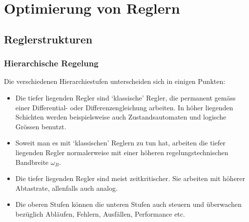 \section{Optimierung von Reglern }
\subsection{Reglerstrukturen }
\subsubsection{Hierarchische Regelung }
Die verschiedenen Hierarchiestufen unterscheiden sich in einigen Punkten:
\begin{itemize}
	\item Die tiefer liegenden Regler sind ‘klassische’ Regler, die permanent gemäss einer
	Differential- oder Differenzengleichung arbeiten. In höher liegenden Schichten
	werden beispielsweise auch Zustandsautomaten und logische Grössen benutzt.
	\item Soweit man es mit ‘klassischen’ Reglern zu tun hat, arbeiten die tiefer liegenden
	Regler normalerweise mit einer höheren regelungstechnischen Bandbreite $\omega_B$.
	\item Die tiefer liegenden Regler sind meist zeitkritischer. Sie arbeiten mit höherer
	Abtastrate, allenfalls auch analog.
	\item Die oberen Stufen können die unteren Stufen auch steuern und überwachen
	bezüglich Abläufen, Fehlern, Ausfällen, Performance etc.
\end{itemize}

\clearpage
